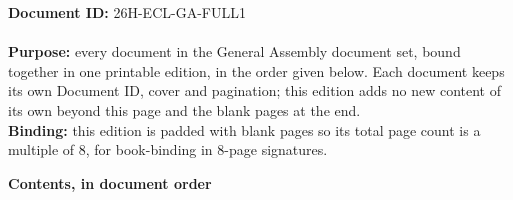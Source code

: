 \documentclass{../../../Common/Latex/Templates/rapport}
\date{\meetingdate, \meetingtime}
\begin{document}
\makecoverpage
\reportmainmatter
\pagestyle{fullcounter}

\noindent\textbf{Document ID:} 26H-ECL-GA-FULL1\\
\meetingline\\
\textbf{Purpose:} every document in the General Assembly document set, bound together in one printable edition, in the order given below. Each document keeps its own Document ID, cover and pagination; this edition adds no new content of its own beyond this page and the blank pages at the end.\\
\textbf{Binding:} this edition is padded with blank pages so its total page count is a multiple of 8, for book-binding in 8-page signatures.

\vspace{0.6em}
\textbf{Contents, in document order}
\end{document}
